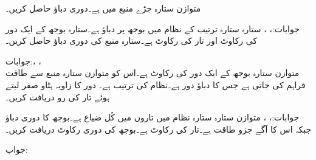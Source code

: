 متوازن  ستارہ جڑے منبع میں  ہے۔دوری دباؤ حاصل کریں۔

جوابات:، ، 
ستارہ ستارہ  ترتیب کے نظام میں بوجھ پر دباؤ  ہے۔ستارہ بوجھ کے ایک دور کی رکاوٹ  اور تار کی رکاوٹ  ہے۔ستارہ منبع کی دوری دباؤ حاصل کریں۔

جوابات:، ، \\ 
متوازن ستارہ بوجھ کے ایک دور کی رکاوٹ  ہے۔اس کو متوازن ستارہ منبع سے طاقت فراہم کی جاتی ہے جس کا دباؤ دور  ہے۔نظام کی ترتیب  ہے۔ دور  کا زاویہ ہٹاو صفر لیتے ہوئے تار کی رو دریافت کریں۔

جوابات:، ، 
متوازن ستارہ ستارہ نظام میں تاروں میں کُل ضیاع  ہے۔بوجھ کا دوری دباؤ  جبکہ اس کا آگے جزو طاقت  ہے۔تار کی رکاوٹ  ہے۔بوجھ کی دوری رکاوٹ دریافت کریں۔

جواب:

